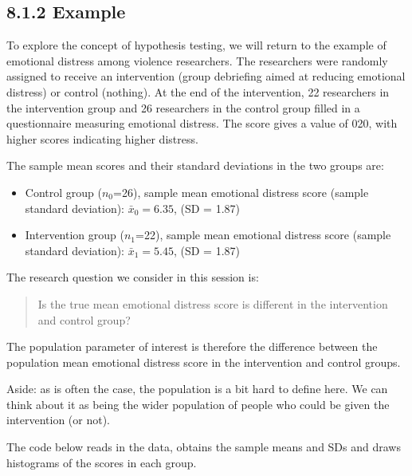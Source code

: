\documentclass[letterpaper,10pt,english]{jupyterBook}
\begin{document}
\subsection{8.1.2 Example}
\label{\detokenize{08.b. Frequentist II:example}}
\sphinxAtStartPar
To explore the concept of hypothesis testing, we will return to the example of emotional distress among violence researchers. The researchers were randomly assigned to receive an intervention (group debriefing aimed at reducing emotional distress) or control (nothing). At the end of the intervention, 22 researchers in the intervention group and 26 researchers in the control group filled in a questionnaire measuring emotional distress. The score gives a value of 0\sphinxhyphen{}20, with higher scores indicating higher distress.

\sphinxAtStartPar
The sample mean scores and their standard deviations in the two groups are:
\begin{itemize}
\item {} 
\sphinxAtStartPar
Control group (\(n_0\)=26), sample mean emotional distress score (sample standard deviation):  \(\bar{x}_0 = 6.35\), (SD = 1.87)

\item {} 
\sphinxAtStartPar
Intervention group (\(n_1\)=22), sample mean emotional distress score (sample standard deviation):  \(\bar{x}_1 = 5.45\), (SD = 1.87)

\end{itemize}

\sphinxAtStartPar
The research question we consider in this session is:
\begin{quote}

\sphinxAtStartPar
Is the true mean emotional distress score is different in the intervention and control group?
\end{quote}

\sphinxAtStartPar
The population parameter of interest is therefore the difference between the population mean emotional distress score in the intervention and control groups.

\sphinxAtStartPar
Aside: as is often the case, the population is a bit hard to define here. We can think about it as being the wider population of people who could be given the intervention (or not).

\sphinxAtStartPar
The code below reads in the data, obtains the sample means and SDs and draws histograms of the scores in each group.
\end{document}
